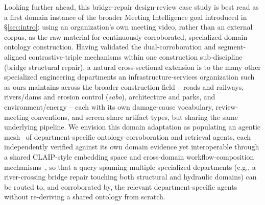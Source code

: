 ﻿\documentclass[twocolumn]{article}
\begin{document}
Looking further ahead, this bridge-repair design-review case study is best read as a first domain
instance of the broader Meeting Intelligence goal introduced in \S\ref{sec:intro}: using an
organization's own meeting video, rather than an external corpus, as the raw material for
continuously corroborated, specialized-domain ontology construction. Having validated the
dual-corroboration and segment-aligned contrastive-triple mechanisms within one construction
sub-discipline (bridge structural repair), a natural cross-sectional extension is to the many other
specialized engineering departments an infrastructure-services organization such as ours maintains
across the broader construction field -- roads and railways, rivers/dams and erosion control
(\textit{sabo}), architecture and parks, and environment/energy -- each with its own damage-cause
vocabulary, review-meeting conventions, and screen-share artifact types, but sharing the same
underlying pipeline. We envision this domain adaptation as populating an agentic
mesh~\cite{debnath2025agenticmesh} of department-specific ontology-corroboration and retrieval
agents, each independently verified against its own domain evidence yet interoperable through a
shared CLAIP-style embedding space and cross-domain workflow-composition
mechanisms~\cite{wang2026crossdomainworkflow}, so that a query spanning multiple specialized
departments (e.g., a river-crossing bridge repair touching both structural and hydraulic domains)
can be routed to, and corroborated by, the relevant department-specific agents without re-deriving a
shared ontology from scratch.



\end{document}

